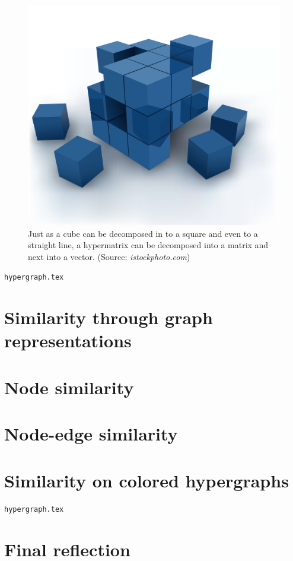 \documentclass[a4paper,11pt]{report}
\begin{document}
\begin{figure}
  \centering
  \includegraphics[scale=0.05]{cube.jpg}\caption{Just as a cube can be decomposed in to a square and even to a straight line,
  a hypermatrix can be decomposed into a matrix and next into a vector. (Source: \emph{istockphoto.com})}\label{visualizatie}
\end{figure}
 
 

\texttt{hypergraph.tex}


\section{Similarity through graph representations}

\section{Node similarity}
\section{Node-edge similarity}
\section{Similarity on colored hypergraphs}
\texttt{hypergraph.tex}

\section{Final reflection}
\end{document}
